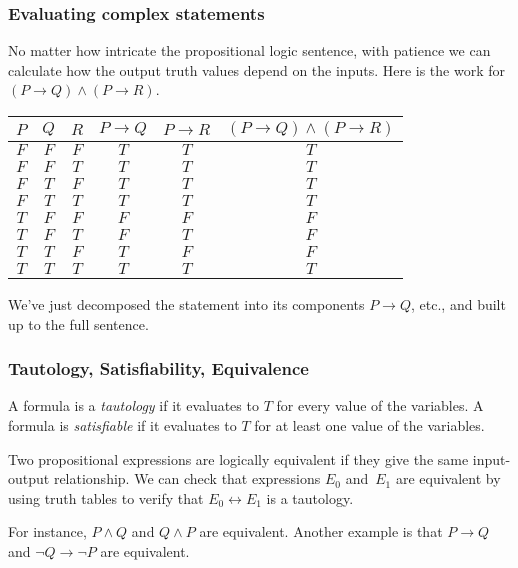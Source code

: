 \documentclass[10pt,t]{beamer}
\begin{document}
\begin{frame}
  \frametitle{Evaluating complex statements}
  No matter how intricate the propositional logic sentence, with patience 
  we can calculate how the output truth values
  depend on the inputs.
  Here is the work for
  $(P\rightarrow Q)\wedge (P\rightarrow R)$.
  \begin{center}
    \begin{tabular}{ccc|ccc}
      $P$  &$Q$  &$R$ &$P\rightarrow Q$ &$P\rightarrow R$ &$(P\rightarrow Q)\wedge (P\rightarrow R)$  \\ \hline
      $F$  &$F$  &$F$  &$T$  &$T$  &$T$   \\
      $F$  &$F$  &$T$  &$T$  &$T$  &$T$   \\
      $F$  &$T$  &$F$  &$T$  &$T$  &$T$   \\
      $F$  &$T$  &$T$  &$T$  &$T$  &$T$   \\[0.75ex]
      $T$  &$F$  &$F$  &$F$  &$F$  &$F$   \\
      $T$  &$F$  &$T$  &$F$  &$T$  &$F$   \\
      $T$  &$T$  &$F$  &$T$  &$F$  &$F$   \\
      $T$  &$T$  &$T$  &$T$  &$T$  &$T$      
    \end{tabular}
  \end{center}
  We've just decomposed the statement into its 
  components $P\rightarrow Q$, etc., and built up to the full sentence.
\end{frame}




\begin{frame}
  \frametitle{Tautology, Satisfiability, Equivalence}
  A formula is a \emph{tautology} if it evaluates to $T$ for every value
  of the variables.
  A formula is \emph{satisfiable} if it evaluates to $T$ for at least one
  value of the variables.

  \pause
  Two propositional expressions are \alert{logically equivalent} if they
  give the same input-output relationship. 
  We can check that expressions 
  $E_0$ and~$E_1$ are equivalent by using truth tables to
  verify that  
  $E_0\leftrightarrow E_1$ is a tautology.  

  For instance, $P\wedge Q$ and $Q\wedge P$ are equivalent.
  Another example is that $P\rightarrow Q$ and $\neg Q\rightarrow \neg P$ 
  are equivalent.
\end{frame}
\end{document}
